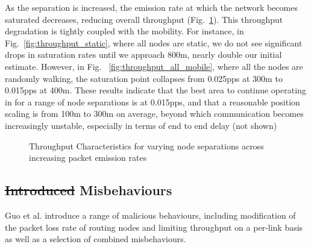 \documentclass[conference]{IEEEtran}
\providecommand{\DIFadd}[1]{{\protect\color{blue}\uwave{#1}}} %
\providecommand{\DIFdel}[1]{{\protect\color{red}\sout{#1}}}                      %
\providecommand{\DIFaddbegin}{} %
\providecommand{\DIFaddend}{} %
\providecommand{\DIFdelbegin}{} %
\providecommand{\DIFdelend}{} %
\begin{document}
As the separation is increased, the emission rate at which the network becomes saturated decreases, reducing overall throughput (Fig.~\ref{fig:scenario_throughputs_plain}). 
This throughput degradation is tightly coupled with the mobility.
For instance, in Fig.~\ref{fig:throughput_static}, where all nodes are static, we do not see significant drops in saturation rates until we approach 800m, nearly double our initial estimate. 
However, in Fig. ~\ref{fig:throughput_all_mobile}, where all the nodes are randomly walking, the saturation point collapses from 0.025pps at 300m to 0.015pps at 400m.
These results indicate that the best area to continue operating in for a range of node separations is at 0.015pps, and that a reasonable position scaling is from 100m to 300m on average, beyond which communication becomes increasingly unstable, especially in terms of end to end delay (not shown) 
%
%
\begin{figure}[h]
  \centering
\caption{Throughput Characteristics for varying node separations across increasing packet emission rates}
\label{fig:scenario_throughputs_plain}
\end{figure}\DIFaddbegin {}
\DIFaddend %

\subsection{\DIFdelbegin \DIFdel{Introduced }\DIFdelend \DIFaddbegin \DIFadd{Selected }\DIFaddend Misbehaviours}
Guo et al. introduce a range of malicious behaviours, including modification of the packet loss rate of routing nodes and limiting throughput on a per-link basis as well as a selection of combined misbehaviours. 
\end{document}
